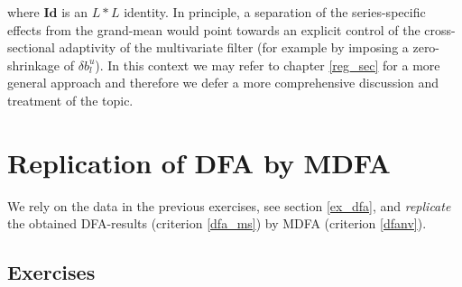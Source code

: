 \documentclass[a4paper]{book}
\begin{document}
where $\mathbf{Id}$ is an $L*L$ identity. In principle, a separation of the series-specific effects from the grand-mean would point towards an explicit control of the cross-sectional adaptivity of the multivariate filter (for example by imposing a zero-shrinkage of $\delta b_l^u$). In this context we may refer to chapter \ref{reg_sec} for a more general approach and therefore we defer a more comprehensive discussion and treatment of the topic.



\section{Replication of DFA by MDFA}\label{ex_rep_dfa}



We rely on the data in the previous exercises, see section \ref{ex_dfa}, and \emph{replicate} the obtained DFA-results (criterion \ref{dfa_ms}) by MDFA (criterion \ref{dfanv}). 

\subsection{Exercises}\label{ex_rep_dfa_11}
\end{document}
